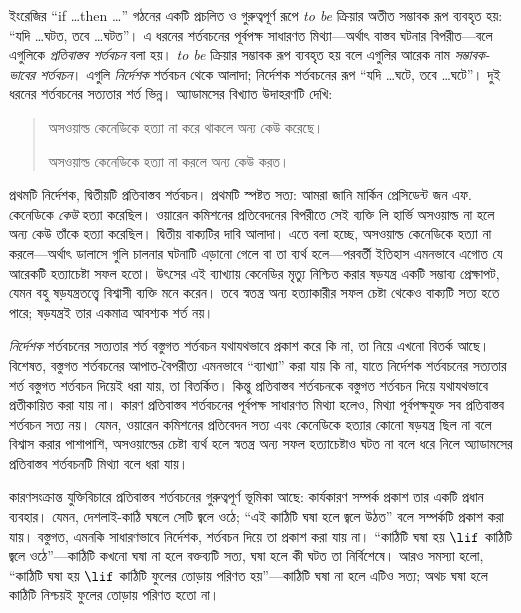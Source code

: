 \documentclass[../../../include/open-logic-section]{subfiles}
\begin{document}


ইংরেজির ``if \dots then \dots'' গঠনের একটি প্রচলিত
ও গুরুত্বপূর্ণ রূপে \emph{to be} ক্রিয়ার অতীত সম্ভাবক
রূপ ব্যবহৃত হয়: ``যদি \dots ঘটত, তবে \dots ঘটত''।
এ ধরনের শর্তবচনের পূর্বপক্ষ সাধারণত মিথ্যা—অর্থাৎ বাস্তব
ঘটনার বিপরীত—বলে এগুলিকে \emph{প্রতিবাস্তব শর্তবচন}
বলা হয়। \emph{to be} ক্রিয়ার সম্ভাবক রূপ ব্যবহৃত হয়
বলে এগুলির আরেক নাম \emph{সম্ভাবক-ভাবের শর্তবচন}।
এগুলি \emph{নির্দেশক} শর্তবচন থেকে আলাদা; নির্দেশক
শর্তবচনের রূপ ``যদি \dots ঘটে, তবে \dots ঘটে''।
দুই ধরনের শর্তবচনের সত্যতার শর্ত ভিন্ন। অ্যাডামসের
বিখ্যাত উদাহরণটি দেখি:
\begin{quote}
  অসওয়াল্ড কেনেডিকে হত্যা না করে থাকলে অন্য কেউ করেছে।

  অসওয়াল্ড কেনেডিকে হত্যা না করলে অন্য কেউ করত।
\end{quote}
প্রথমটি নির্দেশক, দ্বিতীয়টি প্রতিবাস্তব শর্তবচন। প্রথমটি
স্পষ্টত সত্য: আমরা জানি মার্কিন প্রেসিডেন্ট জন এফ.
কেনেডিকে \emph{কেউ} হত্যা করেছিল। ওয়ারেন কমিশনের
প্রতিবেদনের বিপরীতে সেই ব্যক্তি লি হার্ভি অসওয়াল্ড
না হলে অন্য কেউ তাঁকে হত্যা করেছিল। দ্বিতীয় বাক্যটির
দাবি আলাদা। এতে বলা হচ্ছে, অসওয়াল্ড কেনেডিকে হত্যা
না করলে—অর্থাৎ ডালাসে গুলি চালনার ঘটনাটি এড়ানো গেলে
বা তা ব্যর্থ হলে—পরবর্তী ইতিহাস এমনভাবে এগোত যে
আরেকটি হত্যাচেষ্টা সফল হতো।
উৎসের এই ব্যাখ্যায় কেনেডির মৃত্যু নিশ্চিত করার ষড়যন্ত্র
একটি সম্ভাব্য প্রেক্ষাপট, যেমন বহু ষড়যন্ত্রতত্ত্বে বিশ্বাসী ব্যক্তি
মনে করেন। তবে স্বতন্ত্র অন্য হত্যাকারীর সফল চেষ্টা থেকেও
বাক্যটি সত্য হতে পারে; ষড়যন্ত্রই তার একমাত্র আবশ্যক শর্ত নয়।

\emph{নির্দেশক} শর্তবচনের সত্যতার শর্ত বস্তুগত
শর্তবচন যথাযথভাবে প্রকাশ করে কি না, তা নিয়ে এখনো
বিতর্ক আছে। বিশেষত, বস্তুগত শর্তবচনের আপাত-বৈপরীত্য
এমনভাবে ``ব্যাখ্যা'' করা যায় কি না, যাতে নির্দেশক
শর্তবচনের সত্যতার শর্ত বস্তুগত শর্তবচন দিয়েই ধরা যায়,
তা বিতর্কিত। কিন্তু প্রতিবাস্তব শর্তবচনকে বস্তুগত
শর্তবচন দিয়ে যথাযথভাবে প্রতীকায়িত করা যায় না। কারণ
প্রতিবাস্তব শর্তবচনের পূর্বপক্ষ সাধারণত মিথ্যা হলেও,
মিথ্যা পূর্বপক্ষযুক্ত সব প্রতিবাস্তব শর্তবচন সত্য নয়।
যেমন, ওয়ারেন কমিশনের প্রতিবেদন সত্য এবং কেনেডিকে
হত্যার কোনো ষড়যন্ত্র ছিল না বলে বিশ্বাস করার পাশাপাশি,
অসওয়াল্ডের চেষ্টা ব্যর্থ হলে স্বতন্ত্র অন্য সফল হত্যাচেষ্টাও
ঘটত না বলে ধরে নিলে অ্যাডামসের প্রতিবাস্তব শর্তবচনটি
মিথ্যা বলে ধরা যায়।

কারণসংক্রান্ত যুক্তিবিচারে প্রতিবাস্তব শর্তবচনের গুরুত্বপূর্ণ
ভূমিকা আছে: কার্যকারণ সম্পর্ক প্রকাশ তার একটি প্রধান
ব্যবহার। যেমন, দেশলাই-কাঠি ঘষলে সেটি জ্বলে ওঠে;
``এই কাঠিটি ঘষা হলে জ্বলে উঠত'' বলে সম্পর্কটি প্রকাশ
করা যায়। বস্তুগত, এমনকি সাধারণভাবে নির্দেশক,
শর্তবচন দিয়ে তা প্রকাশ করা যায় না। ``কাঠিটি ঘষা হয়
$\lif$ কাঠিটি জ্বলে ওঠে''—কাঠিটি কখনো ঘষা না হলে
বক্তব্যটি সত্য, ঘষা হলে কী ঘটত তা নির্বিশেষে। আরও
সমস্যা হলো, ``কাঠিটি ঘষা হয় $\lif$ কাঠিটি ফুলের
তোড়ায় পরিণত হয়''—কাঠিটি ঘষা না হলে এটিও সত্য;
অথচ ঘষা হলে কাঠিটি নিশ্চয়ই ফুলের তোড়ায় পরিণত হতো না।
\end{document}
